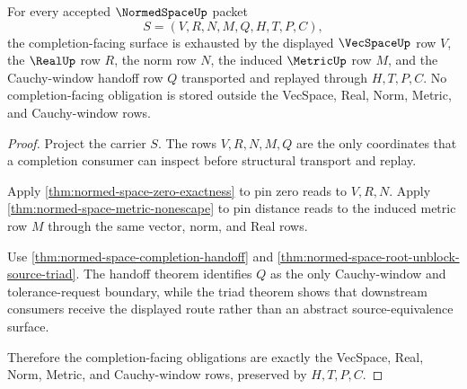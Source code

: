 \begin{theorem}
\label{thm:normed-space-completion-facing-obligation-triad}
For every accepted $\NormedSpaceUp$ packet
$$
S=(V,R,N,M,Q,H,T,P,C),
$$
the completion-facing surface is exhausted by the displayed $\VecSpaceUp$ row $V$, the $\RealUp$ row $R$, the norm row $N$, the induced $\MetricUp$ row $M$, and the Cauchy-window handoff row $Q$ transported and replayed through $H,T,P,C$. No completion-facing obligation is stored outside the VecSpace, Real, Norm, Metric, and Cauchy-window rows.
\end{theorem}
\begin{proof}
Project the carrier $S$. The rows $V,R,N,M,Q$ are the only coordinates that a completion consumer can inspect before structural transport and replay.

Apply \autoref{thm:normed-space-zero-exactness} to pin zero reads to $V,R,N$. Apply \autoref{thm:normed-space-metric-nonescape} to pin distance reads to the induced metric row $M$ through the same vector, norm, and Real rows.

Use \autoref{thm:normed-space-completion-handoff} and \autoref{thm:normed-space-root-unblock-source-triad}. The handoff theorem identifies $Q$ as the only Cauchy-window and tolerance-request boundary, while the triad theorem shows that downstream consumers receive the displayed route rather than an abstract source-equivalence surface.

Therefore the completion-facing obligations are exactly the VecSpace, Real, Norm, Metric, and Cauchy-window rows, preserved by $H,T,P,C$.
\end{proof}

